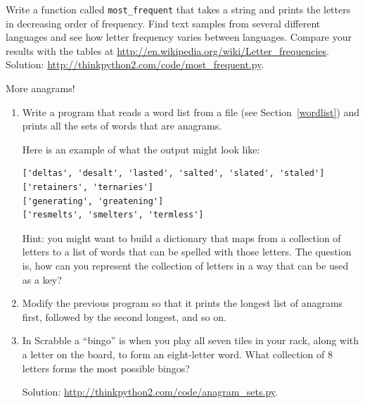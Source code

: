 \documentclass[10pt]{book}
\begin{document}
\begin{exercise}

Write a function called \verb"most_frequent" that takes a string and
prints the letters in decreasing order of frequency.  Find text
samples from several different languages and see how letter frequency
varies between languages.  Compare your results with the tables at
\url{http://en.wikipedia.org/wiki/Letter_frequencies}.  Solution:
\url{http://thinkpython2.com/code/most_frequent.py}.   

\end{exercise}


\begin{exercise}
\label{anagrams}

More anagrams!

\begin{enumerate}

\item Write a program
that reads a word list from a file (see Section~\ref{wordlist}) and
prints all the sets of words that are anagrams.

Here is an example of what the output might look like:

\begin{verbatim}
['deltas', 'desalt', 'lasted', 'salted', 'slated', 'staled']
['retainers', 'ternaries']
['generating', 'greatening']
['resmelts', 'smelters', 'termless']
\end{verbatim}
%
Hint: you might want to build a dictionary that maps from a
collection of letters to a list of words that can be spelled with those
letters.  The question is, how can you represent the collection of
letters in a way that can be used as a key?

\item Modify the previous program so that it prints the longest list
of anagrams first, followed by the second longest, and so on.

\item In Scrabble a ``bingo'' is when you play all seven tiles in
your rack, along with a letter on the board, to form an eight-letter
word.  What collection of 8 letters forms the most possible bingos?


Solution: \url{http://thinkpython2.com/code/anagram_sets.py}.

\end{enumerate}
\end{exercise}
\end{document}
